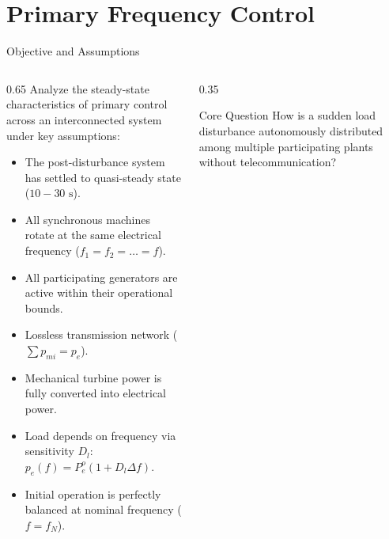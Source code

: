 \section{Primary Frequency Control}

\begin{frame}{Objective and Assumptions}
\begin{columns}[T]
\begin{column}{0.65\textwidth}
    \scriptsize
    Analyze the steady-state characteristics of primary control across an interconnected system under key assumptions:
    \begin{itemize}\setlength{\itemsep}{2pt}
        \item The post-disturbance system has settled to quasi-steady state ($10 - 30\text{ s}$).
        \item All synchronous machines rotate at the same electrical frequency ($f_1 = f_2 = \dots = f$).
        \item All participating generators are active within their operational bounds.
        \item Lossless transmission network ($\sum p_{mi} = p_e$).
        \item Mechanical turbine power is fully converted into electrical power.
        \item Load depends on frequency via sensitivity $D_l$: $p_e(f) = P_e^o(1 + D_l \Delta f)$.
        \item Initial operation is perfectly balanced at nominal frequency ($f = f_N$).
    \end{itemize}
\end{column}
\begin{column}{0.35\textwidth}
    \begin{block}{Core Question}
    \scriptsize
    How is a sudden load disturbance autonomously distributed among multiple participating plants without telecommunication?
    \end{block}
\end{column}
\end{columns}
\end{frame}

